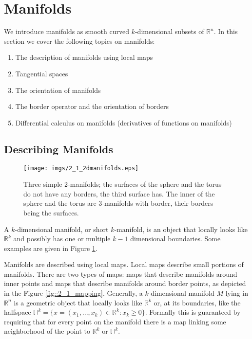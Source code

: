 \section{Manifolds}
\label{sec::2_Manifolds}
We introduce manifolds as smooth curved $k$-dimensional subsets of $\mathbb R^n$. %
In this section we cover the following topics on manifolds:
\begin{enumerate}
\item The description of manifolds using local maps
\item Tangential spaces
\item The orientation of manifolds
\item The border operator and the orientation of borders
\item Differential calculus on manifolds (derivatives of functions on manifolds)
\end{enumerate}
		
\subsection{Describing Manifolds}	

\begin{figure}
	\begin{center}
		\texttt{[image: imgs/2\_1\_2dmanifolds.eps]}
	\end{center}
		\caption{Three simple 2-manifolds; the surfaces of the sphere and the torus do not have any borders, the third surface has. The inner of the sphere and the torus are 3-manifolds with border, their borders being the surfaces.}
		\label{fig::2_1_manifold}
\end{figure}

A $k$-dimensional manifold, or short $k$-manifold, is an object that locally looks like $\mathbb{R}^k$ and possibly has one or multiple $k-1$ dimensional boundaries. Some examples are given in Figure \ref{fig::2_1_manifold}.

Manifolds are described using local maps. Local maps describe small portions of manifolds. There are two types of maps: maps that describe manifolds around inner points and maps that describe manifolds around border points, as depicted in the Figure \ref{fig::2_1_mapping}. %
Generally, a $k$-dimensional manifold $M$ lying in $\mathbb R^n$ is a geometric object that locally looks like $\mathbb R^k$ or, at its boundaries, like the halfspace $\mathbb H^k = \{x= (x_1,...,x_k) \in \mathbb R^k : x_k \geq 0\}$.  Formally this is guaranteed by requiring that for every point on the manifold there is a map linking some neighborhood of the point to $\mathbb R^k$ or $\mathbb H^k$.

